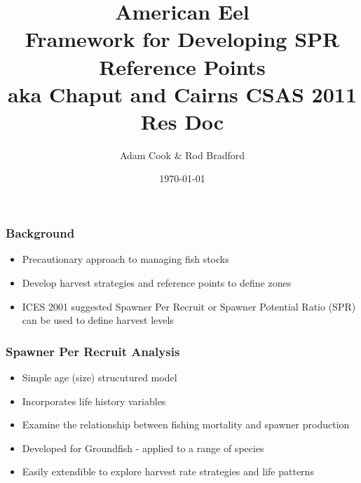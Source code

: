 \documentclass{beamer}
\title[SPR for American Eel]{American Eel\\ Framework for Developing SPR Reference Points \\ \tiny aka Chaput and Cairns CSAS 2011 Res Doc}
\author{Adam Cook \& Rod Bradford} %
\institute[Population Ecology Division]
{Bedford Institute of Oceanography \\ %
\medskip
\textit{Adam.Cook@dfo-mpo.gc.ca} %
}
\date{\today} %
\begin{document}
\begin{frame}
	\titlepage %

\end{frame}


%
\begin{frame}
\frametitle{Background}
%
\begin{itemize}
	\item Precautionary approach to managing fish stocks
	\item Develop harvest strategies and reference points to define zones
	\item ICES 2001 suggested Spawner Per Recruit or Spawner Potential Ratio (SPR) can be used to define harvest levels 
\end{itemize}

\end{frame}

\begin{frame}

	\frametitle{Spawner Per Recruit Analysis}

	\begin{itemize}
		\item Simple age (size) strucutured model
		\item Incorporates life history variables
		\item Examine the relationship between fishing mortality and spawner production 
		\item Developed for Groundfish - applied to a range of species
		\item Easily extendible to explore harvest rate strategies and life patterns
	\end{itemize}


\end{frame}
\end{document}
